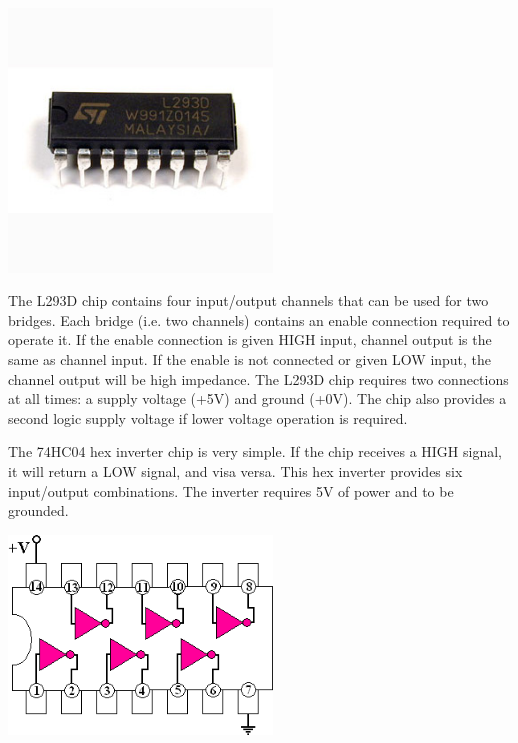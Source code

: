 \begin{minipage}{6.5in}
 \centering
    \includegraphics[width=70mm]{imageSources/hBridge.png}
  \label{hBridge}
\end{minipage}
\vspace{0.1in}


The L293D chip contains four input/output channels that can be used for two bridges. Each bridge (i.e. two channels) contains an enable connection required to operate it. If the enable connection is given HIGH input, channel output is the same as channel input. If the enable is not connected or given LOW input, the channel output will be high impedance. The L293D chip requires two connections at all times: a supply voltage (+5V) and ground (+0V). The chip also provides a second logic supply voltage if lower voltage operation is required.

The 74HC04 hex inverter chip is very simple. If the chip receives a HIGH signal, it will return a LOW signal, and visa versa. This hex inverter provides six input/output combinations. The inverter requires 5V of power and to be grounded.

\begin{minipage}{6.5in}
  \centering
    \includegraphics[width=70mm]{imageSources/hexInverter.png}
 
  \label{hexInverter}
\end{minipage}
\vspace{0.1in}

